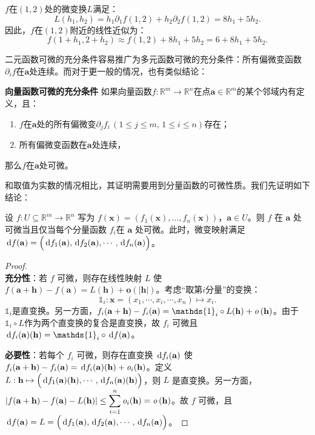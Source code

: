 \documentclass[12pt,UTF8,fontset=none]{ctexbook}
\begin{document}
\begin{appendix}
\begin{so}
$f$在$(1,2)$处的微变换$L$满足：
$$ L(h_1,h_2) = h_1\partial_1 f(1,2) + h_2\partial_2 f(1,2) = 8h_1 + 5h_2. $$
因此，$f$在$(1,2)$附近的线性近似为：
$$ f(1+h_1,2+h_2) \approx f(1,2) + 8h_1 + 5h_2 = 6 + 8h_1 + 5h_2. $$
\end{so}

二元函数可微的充分条件容易推广为多元函数可微的充分条件：所有偏微变函数$\partial_i f$在$\mathbf{a}$处连续。而对于更一般的情况，也有类似结论：
\begin{tm}{\textbf{向量函数可微的充分条件}}\label{tm:a-1-10}
如果向量函数$f:\mathbb{R}^m\rightarrow\mathbb{R}^n$在点$\mathbf{a}\in\mathbb{R}^m$的某个邻域内有定义，且：
\begin{enumerate}[label=\arabic*.]
\item $f$在$\mathbf{a}$处的所有偏微变$\partial_j f_i\,( 1\leqslant j\leqslant m,\,1\leqslant i\leqslant n)$存在；
\item 所有偏微变函数在$\mathbf{a}$处连续，
\end{enumerate}
那么$f$在$\mathbf{a}$处可微。
\end{tm}
和取值为实数的情况相比，其证明需要用到分量函数的可微性质。我们先证明如下结论：
\begin{tm}\label{tm:a-1-20}
    设 $f:U\subseteq\mathbb{R}^m\to\mathbb{R}^n$ 写为 $f(\mathbf{x}) = (f_1(\mathbf{x}),\dots,f_n(\mathbf{x}))$，$\mathbf{a}\in U$。则 $f$ 在 $\mathbf{a}$ 处可微当且仅当每个分量函数 $f_i$在 $\mathbf{a}$ 处可微。此时，微变映射满足 $\,\mathrm{d} f (\mathbf{a}) = \Big(\,\mathrm{d} f_1 (\mathbf{a}), \,\mathrm{d} f_2 (\mathbf{a}),\cdots,\,\mathrm{d} f_n (\mathbf{a})\Big)$。
\end{tm}
\begin{proof}
    \mbox{}\\
    \textbf{充分性}：若 $f$ 可微，则存在线性映射 $L$ 使 $f(\mathbf{a}+\mathbf{h})-f(\mathbf{a}) = L(\mathbf{h}) + \mathbf{o}(|\mathbf{h}|)$。考虑“取第$i$分量”的变换：
    $$ \mathds{1}_i : \mathbf{x} = (x_1, \cdots, x_i,\cdots, x_n) \mapsto x_i.$$
    $\mathds{1}_i$是直变换。另一方面，$f_i(\mathbf{a}+\mathbf{h})-f_i(\mathbf{a}) = \mathds{1}_i\circ L(\mathbf{h}) + \olim{\mathbf{h}}$。由于 $\mathds{1}_i\circ L$作为两个直变换的复合是直变换，故 $f_i$ 可微且 $\diff f_i(\mathbf{a})(\mathbf{h}) = \mathds{1}_i\circ \diff f(\mathbf{a})$。

    \noindent\textbf{必要性}：若每个 $f_i$ 可微，则存在直变换 $\,\mathrm{d} f_i (\mathbf{a})$ 使 $f_i(\mathbf{a}+\mathbf{h})-f_i(\mathbf{a}) = \,\mathrm{d} f_i (\mathbf{a})(\mathbf{h}) + \mathit{o}_i(\mathbf{h})$。定义 $L:\mathbf{h} \mapsto \Big(\,\mathrm{d} f_1 (\mathbf{a})(\mathbf{h}),\cdots,\,\mathrm{d} f_n (\mathbf{a})(\mathbf{h})\Big)$，则 $L$ 是直变换。另一方面， $\displaystyle |f(\mathbf{a}+\mathbf{h})-f(\mathbf{a})-L(\mathbf{h})| \le \sum_{i=1}^n \mathit{o}_i(\mathbf{h}) = \mathit{o}\left(\mathbf{h}\right)$。故 $f$ 可微，且$\,\mathrm{d} f (\mathbf{a}) = L = \Big(\,\mathrm{d} f_1 (\mathbf{a}), \,\mathrm{d} f_2 (\mathbf{a}),\cdots,\,\mathrm{d} f_n (\mathbf{a})\Big)$。
\end{proof}


\end{appendix}
\end{document}
